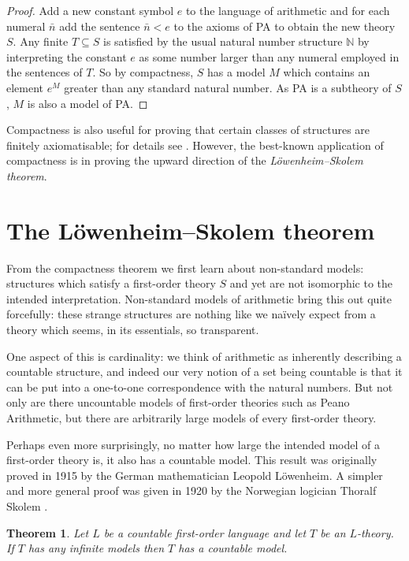 \documentclass[10pt, a4paper, oneside]{article}
\newtheorem{thm}{Theorem}[section]
\theoremstyle{definition}
\theoremstyle{remark}
\theoremstyle{plain}
\theoremstyle{plain}
\begin{document}
\begin{proof}
    Add a new constant symbol $e$ to the language of arithmetic and for each
    numeral $\bar{n}$ add the sentence $\bar{n} < e$ to the axioms of PA to
    obtain the new theory $S$. Any finite $T \subseteq S$ is satisfied by the
    usual natural number structure $\mathbb{N}$ by interpreting the constant $e$
    as some number larger than any numeral employed in the sentences of $T$. So
    by compactness, $S$ has a model $M$ which contains an element $e^M$ greater
    than any standard natural number. As PA is a subtheory of $S$, $M$ is also a
    model of PA.
\end{proof}

Compactness is also useful for proving that certain classes of structures are
finitely axiomatisable; for details see \citealt[pp. 114--116]{vdalen2004}.
However, the best-known application of compactness is in proving the upward
direction of the \emph{Löwenheim--Skolem theorem}.


\section{The Löwenheim--Skolem theorem}

From the compactness theorem we first learn about non-standard models:
structures which satisfy a first-order theory $S$ and yet are not isomorphic to
the intended interpretation. Non-standard models of arithmetic bring this out
quite forcefully: these strange structures are nothing like we naïvely expect
from a theory which seems, in its essentials, so transparent.

One aspect of this is cardinality: we think of arithmetic as inherently
describing a countable structure, and indeed our very notion of a set being
countable is that it can be put into a one-to-one correspondence with the
natural numbers. But not only are there uncountable models of first-order
theories such as Peano Arithmetic, but there are arbitrarily large models of
every first-order theory.

Perhaps even more surprisingly, no matter how large the intended model of a
first-order theory is, it also has a countable model. This result was originally
proved in 1915 by the German mathematician Leopold Löwenheim. A simpler and more
general proof was given in 1920 by the Norwegian logician Thoralf Skolem
\citep{lowenheim1915, skolem1920}.

\begin{thm}
    Let $L$ be a countable first-order language and let $T$ be an $L$-theory. If
    $T$ has any infinite models then $T$ has a countable model.
\end{thm}
\end{document}
